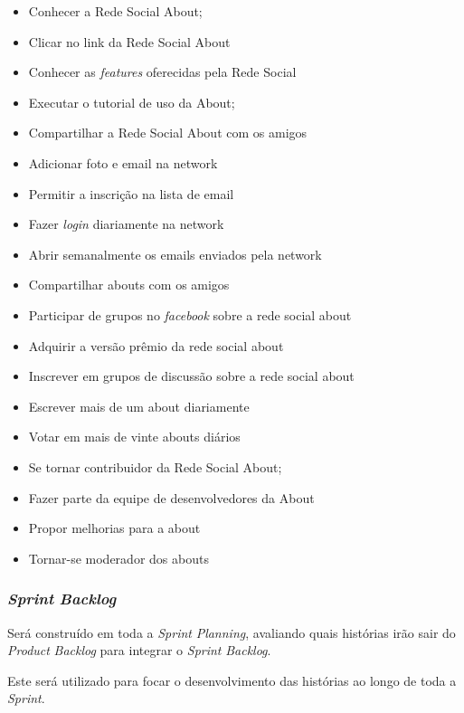 \begin{itemize}
    \item Conhecer a Rede Social About;
    \item Clicar no link da Rede Social About
    \item Conhecer as \textit{features} oferecidas pela Rede Social
    \item Executar o tutorial de uso da About;
    \item Compartilhar a Rede Social About com os amigos
    \item Adicionar foto e email na network
    \item Permitir a inscrição na lista de email
    \item Fazer \textit{login} diariamente na network
    \item Abrir semanalmente os emails enviados pela network
    \item Compartilhar abouts com os amigos
    \item Participar de grupos no \textit{facebook} sobre a rede social about
    \item Adquirir a versão prêmio da rede social about
    \item Inscrever em grupos de discussão sobre a rede social about
    \item Escrever mais de um about diariamente
    \item Votar em mais de vinte abouts diários
    \item Se tornar contribuidor da Rede Social About;
    \item Fazer parte da equipe de desenvolvedores da About
    \item Propor melhorias para a about
    \item Tornar-se moderador dos abouts
\end{itemize}


\subsubsection{\textit{Sprint} \textit{Backlog}}
\label{subsec:sprintbacklog}
Será construído em toda a \textit{Sprint} \textit{Planning}, avaliando quais histórias irão
sair do \textit{Product} \textit{Backlog} para integrar o \textit{Sprint} \textit{Backlog}.

Este será utilizado para focar o desenvolvimento das histórias ao longo de
toda a \textit{Sprint}.
